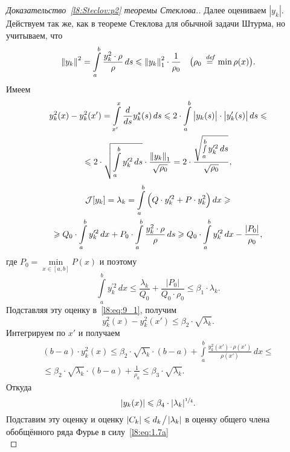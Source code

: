 \begin{proof}[Доказательство~\ref{l8:Steclov:p2} теоремы Стеклова.]
	Далее оцениваем $|y_k|$. Действуем так же, как в теореме Стеклова для обычной задачи Штурма, но учитываем, что
	\begin{equation*}
		\left\|y_k\right\|^2=\int\limits_a^b\frac{y_k^2\cdot\rho}{\rho}\,ds\leqslant\left\|y_k\right\|^2_1\cdot\frac{1}{\rho_0}\quad\big(\rho_0\stackrel{\hspace{0.09 cm}de\!f}{=}\min\rho(x)\big).
	\end{equation*}
	Имеем
	\begin{multline}
		\label{l8:eq:9_1}
		y^2_k(x)-y^2_k(x')=\int\limits_{x'}^{x}\frac{d}{ds}y_k^s(s)\,ds\leqslant2\cdot\int\limits_a^b\big|y_k(s)\big|\cdot\big|y'_k(s)\big|\,ds\leqslant\\\leqslant2\cdot\sqrt{\int\limits_a^b y_k^{\prime2}\,ds}\cdot\frac{\left\|y_k\right\|_1}{\sqrt{\rho_0}}=2\cdot\frac{\sqrt{\smallint\limits_a^b y_k^{\prime2}\,ds}}{\sqrt{\rho_0}},
	\end{multline}
	\begin{multline*}
		\mathcal{J}[y_k]=\lambda_k=\int\limits_a^b\Big(Q\cdot y_k^{\prime2}+P\cdot y_k^2\Big)\,dx\geqslant\\\geqslant Q_0\cdot\int\limits_a^b y_k^{\prime2}\,dx+P_0\cdot\int\limits_a^b\frac{y_k^2\cdot\rho}{\rho}\,ds\geqslant Q_0\cdot\int\limits_a^b y_k^{\prime2}\,dx-\frac{|P_0|}{\rho_0},
	\end{multline*}
	где $P_0=\min\limits_{x\in[a,b]}P(x)$ и поэтому 
	\begin{equation*}
		\int\limits_a^b y_k^{\prime2}\,dx\leqslant\frac{\lambda_k}{Q_0}+\frac{|P_0|}{Q_0\cdot\rho_0}\leqslant\beta_1\cdot\lambda_k.
	\end{equation*}
	Подставляя эту оценку в~\eqref{l8:eq:9_1}{\mb,} получим 
	\begin{equation*}
		 y_k^2(x)-y_k^2(x')\leqslant\beta_2\cdot\sqrt{\lambda_k}.
	\end{equation*}
	Интегрируем по $x'$ и получаем 
	\begin{multline*}
		(b-a)\cdot y_k^2(x)\leqslant\beta_2\cdot\sqrt{\lambda_k}\cdot(b-a)+\int\limits_a^b\frac{y_k^2(x')\cdot\rho(x')}{\rho(x')}\,dx\leqslant\\\leqslant\beta_2\cdot\sqrt{\lambda_k}\cdot(b-a)+\frac{1}{\rho_0}\leqslant\beta_3\cdot\sqrt{\lambda_k}.
	\end{multline*}
	Откуда
	\begin{equation*}
		|y_k(x)|\leqslant\beta_4\cdot|\lambda_k|^{\sfrac{1}{4}}.
	\end{equation*}
	Подставим эту оценку и оценку $|C_k|\leqslant d_k\!\bigm/\!|\lambda_k|$ в оценку общего члена обобщённого ряда Фурье в силу~\eqref{l8:eq:1.7a}
	\begin{equation*}

\end{equation*}
\end{proof}
